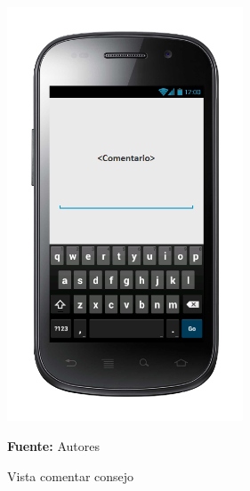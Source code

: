 \begin{figure}[!htb]
  \begin{center}
\includegraphics[width=7cm]{./imagenes/UI/Contenidos/comentar_consejo.png}
    \caption{Vista comentar consejo}
    \label{fig:Vista_comentar_consejo}
    \textbf{Fuente:}  Autores
  \end{center}
\end{figure}
